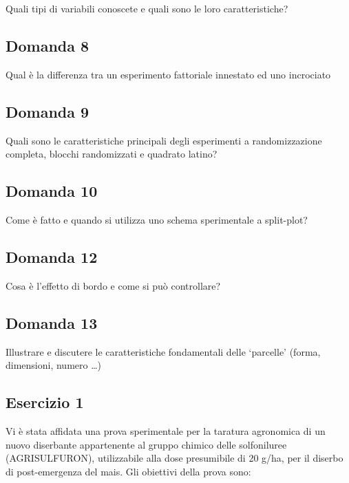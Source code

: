 \documentclass[a4paper,12pt,oneside]{book}
\begin{document}
Quali tipi di variabili conoscete e quali sono le loro caratteristiche?

\hypertarget{domanda-8}{%
\subsection{Domanda 8}\label{domanda-8}}

Qual è la differenza tra un esperimento fattoriale innestato ed uno incrociato

\hypertarget{domanda-9}{%
\subsection{Domanda 9}\label{domanda-9}}

Quali sono le caratteristiche principali degli esperimenti a randomizzazione completa, blocchi randomizzati e quadrato latino?

\hypertarget{domanda-10}{%
\subsection{Domanda 10}\label{domanda-10}}

Come è fatto e quando si utilizza uno schema sperimentale a split-plot?

\hypertarget{domanda-12}{%
\subsection{Domanda 12}\label{domanda-12}}

Cosa è l'effetto di bordo e come si può controllare?

\hypertarget{domanda-13}{%
\subsection{Domanda 13}\label{domanda-13}}

Illustrare e discutere le caratteristiche fondamentali delle `parcelle' (forma, dimensioni, numero \ldots)

\hypertarget{esercizio-1}{%
\subsection{Esercizio 1}\label{esercizio-1}}

Vi è stata affidata una prova sperimentale per la taratura agronomica di un nuovo diserbante appartenente al gruppo chimico delle solfoniluree (AGRISULFURON), utilizzabile alla dose presumibile di 20 g/ha, per il diserbo di post-emergenza del mais. Gli obiettivi della prova sono:
\end{document}
